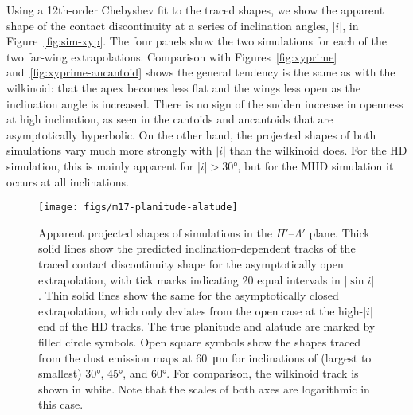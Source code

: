 \documentclass[useAMS, usenatbib, a4paper]{mnras}
\providecommand{\abs}[1]{\lvert#1\rvert}
\begin{document}
Using a 12th-order Chebyshev fit to the traced shapes, we show the
apparent shape of the contact discontinuity at a series of inclination
angles, \(\abs{i}\), in Figure~\ref{fig:sim-xyp}.  The four panels
show the two simulations for each of the two far-wing extrapolations.
Comparison with Figures~\ref{fig:xyprime}
and~\ref{fig:xyprime-ancantoid} shows the general tendency is the same
as with the wilkinoid: that the apex becomes less flat and the wings
less open as the inclination angle is increased.  There is no sign of
the sudden increase in openness at high inclination, as seen in the
cantoids and ancantoids that are asymptotically hyperbolic.  On the
other hand, the projected shapes of both simulations vary much more
strongly with \(\abs{i}\) than the wilkinoid does.  For the HD
simulation, this is mainly apparent for \(\abs{i} > \ang{30}\), but
for the MHD simulation it occurs at all inclinations.


\begin{figure}
  \centering
  \texttt{[image: figs/m17-planitude-alatude]}
  \caption[]{Apparent projected shapes of simulations in the
    \(\Pi'\)--\(\Lambda'\) plane.  Thick solid lines show the predicted
    inclination-dependent tracks of the traced contact discontinuity
    shape for the asymptotically open extrapolation, with tick marks
    indicating 20 equal intervals in \(\abs{\sin i}\). Thin solid
    lines show the same for the asymptotically closed extrapolation,
    which only deviates from the open case at the high-\(\abs{i}\) end
    of the HD tracks.  The true planitude and alatude are marked by
    filled circle symbols.  Open square symbols show the shapes traced
    from the dust emission maps at \SI{60}{\um} for inclinations of
    (largest to smallest) \ang{30}, \ang{45}, and \ang{60}. For
    comparison, the wilkinoid track is shown in white. Note that the
    scales of both axes are logarithmic in this case.}
  \label{fig:sim-Pi-Lambda}
\end{figure}
\end{document}
